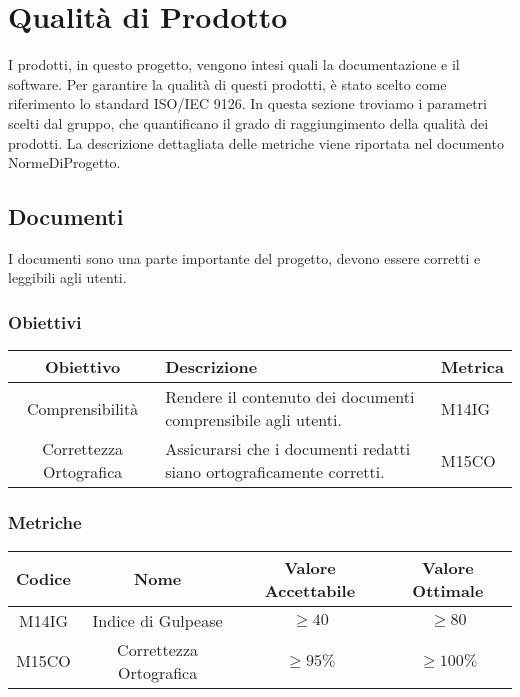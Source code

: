 \section{Qualità di Prodotto}
I prodotti, in questo progetto, vengono intesi quali la documentazione e il software. Per garantire la qualità di questi prodotti, è stato scelto come riferimento lo standard ISO/IEC 9126. In questa sezione troviamo i parametri scelti dal gruppo, che quantificano il grado di raggiungimento della qualità dei prodotti. La descrizione dettagliata delle metriche viene riportata nel documento NormeDiProgetto.

\subsection{Documenti}
I documenti sono una parte importante del progetto, devono essere corretti e leggibili agli utenti.
\subsubsection{Obiettivi}
\begin{center}
	\renewcommand{\arraystretch}{1.8}
	\begin{tabular}{ |c|m{18em}|m{8em}|}
		\hline
		\textbf{Obiettivo} & \textbf{Descrizione} & \textbf{Metrica} \\
		\hline
		Comprensibilità & Rendere il contenuto dei documenti comprensibile agli utenti. & M14IG  \\
		\hline
		Correttezza Ortografica & Assicurarsi che i documenti redatti siano ortograficamente corretti. &  M15CO\\
		\hline
	\end{tabular}
\end{center}

\subsubsection{Metriche}
\begin{center}
\renewcommand{\arraystretch}{1.8}
\begin{tabular}{ |c|c|c|c|}
	\hline
	\textbf{Codice} & \textbf{Nome} & \textbf{Valore Accettabile} & \textbf{Valore Ottimale} \\
	\hline
	M14IG & Indice di Gulpease &  $\geq 40 $ & $\geq 80 $ \\
	\hline
  M15CO & Correttezza Ortografica & $\geq 95\% $ & $\geq 100\% $\\
  \hline
\end{tabular}
\end{center}

